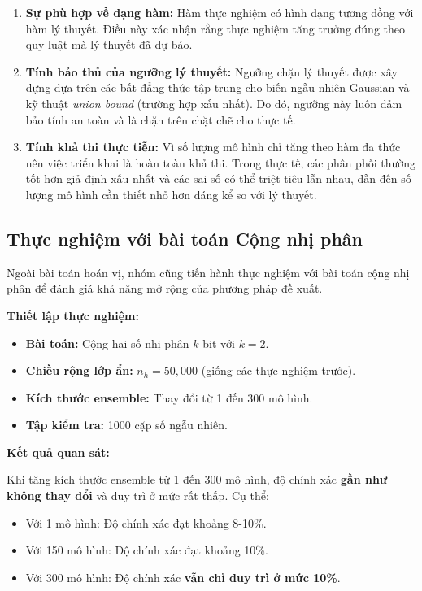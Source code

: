 \begin{enumerate}
    \item \textbf{Sự phù hợp về dạng hàm:} Hàm thực nghiệm có hình dạng tương đồng với hàm lý thuyết. Điều này xác nhận rằng thực nghiệm tăng trưởng đúng theo quy luật mà lý thuyết đã dự báo.
    
    \item \textbf{Tính bảo thủ của ngưỡng lý thuyết:} Ngưỡng chặn lý thuyết được xây dựng dựa trên các bất đẳng thức tập trung cho biến ngẫu nhiên Gaussian và kỹ thuật \textit{union bound} (trường hợp xấu nhất). Do đó, ngưỡng này luôn đảm bảo tính an toàn và là chặn trên chặt chẽ cho thực tế.

    \item \textbf{Tính khả thi thực tiễn:} Vì số lượng mô hình chỉ tăng theo hàm đa thức nên việc triển khai là hoàn toàn khả thi. Trong thực tế, các phân phối thường tốt hơn giả định xấu nhất và các sai số có thể triệt tiêu lẫn nhau, dẫn đến số lượng mô hình cần thiết nhỏ hơn đáng kể so với lý thuyết.
\end{enumerate}

\subsection{Thực nghiệm với bài toán Cộng nhị phân}

Ngoài bài toán hoán vị, nhóm cũng tiến hành thực nghiệm với bài toán cộng nhị phân để đánh giá khả năng mở rộng của phương pháp đề xuất.

\vspace{0.2cm}

\textbf{Thiết lập thực nghiệm:}
\begin{itemize}
    \item \textbf{Bài toán:} Cộng hai số nhị phân $k$-bit với $k = 2$.
    \item \textbf{Chiều rộng lớp ẩn:} $n_h = 50,000$ (giống các thực nghiệm trước).
    \item \textbf{Kích thước ensemble:} Thay đổi từ 1 đến 300 mô hình.
    \item \textbf{Tập kiểm tra:} 1000 cặp số ngẫu nhiên.
\end{itemize}

\vspace{0.2cm}

\textbf{Kết quả quan sát:}

Khi tăng kích thước ensemble từ 1 đến 300 mô hình, độ chính xác \textbf{gần như không thay đổi} và duy trì ở mức rất thấp. Cụ thể:
\begin{itemize}
    \item Với 1 mô hình: Độ chính xác đạt khoảng 8-10\%.
    \item Với 150 mô hình: Độ chính xác đạt khoảng 10\%.
    \item Với 300 mô hình: Độ chính xác \textbf{vẫn chỉ duy trì ở mức 10\%}.
\end{itemize}

